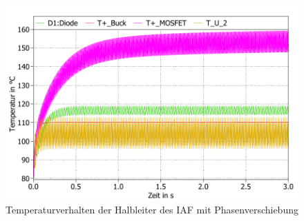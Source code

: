 \begin{figure} 
	\centering
	\includegraphics[width=0.9\linewidth]{content/Grafiken/IAF_Temp_30Grad}
	\caption{Temperaturverhalten der Halbleiter des IAF mit  Phasenverschiebung}
\label{fig:iaftemp30}
\end{figure}

